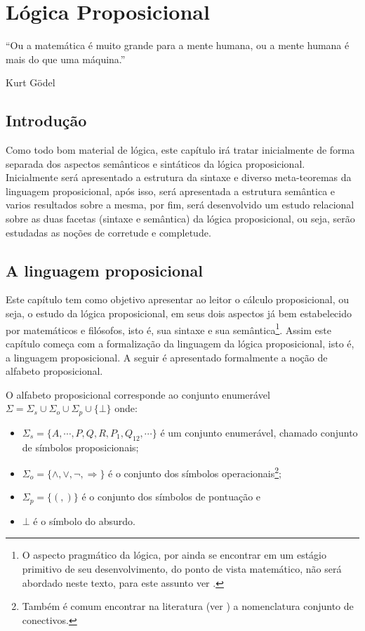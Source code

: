 \chapter{Lógica Proposicional}\label{cap:LogicaProposicional}

\epigraph{``Ou a matemática é muito grande para a mente humana, ou a mente humana é mais do que uma máquina.''}{Kurt Gödel}

\section{Introdução}

Como todo bom material de lógica, este capítulo irá tratar inicialmente de forma separada dos aspectos semânticos e sintáticos da lógica proposicional. Inicialmente será apresentado a estrutura da sintaxe e diverso meta-teoremas da linguagem proposicional, após isso, será apresentada a estrutura semântica e varios resultados sobre a mesma, por fim, será desenvolvido um estudo relacional sobre as duas facetas (sintaxe e semântica) da lógica proposicional, ou seja, serão estudadas as noções de corretude e completude.  

\section{A linguagem proposicional}\label{sec:LingProp}

Este capítulo tem como objetivo apresentar ao leitor o cálculo proposicional, ou seja, o estudo da lógica proposicional, em seus dois aspectos já bem estabelecido por matemáticos e filósofos, isto é,  sua sintaxe e sua semântica\footnote{O aspecto pragmático da lógica, por ainda se encontrar em um estágio primitivo de seu desenvolvimento, do ponto de vista matemático, não será abordado neste texto, para este assunto ver \cite{rodrigues2021, silva2018}.}. Assim este capítulo começa com a formalização da linguagem da lógica proposicional, isto é, a linguagem proposicional. A seguir é apresentado formalmente a noção de alfabeto proposicional.

\begin{definition}\label{def:AlfProp}
	O alfabeto proposicional corresponde ao conjunto enumerável $\Sigma = \Sigma_s \cup \Sigma_o \cup \Sigma_p \cup \{\bot\}$ onde:
	\begin{itemize}
		\item $\Sigma_s = \{A, \cdots, P, Q, R, P_1, Q_{12}, \cdots\}$ é um conjunto enumerável, chamado conjunto de símbolos proposicionais;
		\item $\Sigma_o = \{\land, \lor, \neg, \Rightarrow\}$ é o conjunto dos símbolos operacionais\footnote{Também é comum encontrar na literatura (ver \cite{joaoPavao2014}) a nomenclatura conjunto de conectivos.};
		\item $\Sigma_p = \{(, )\}$ é o conjunto dos símbolos de pontuação e
		\item $\bot$ é o símbolo do absurdo.
	\end{itemize}
\end{definition}

